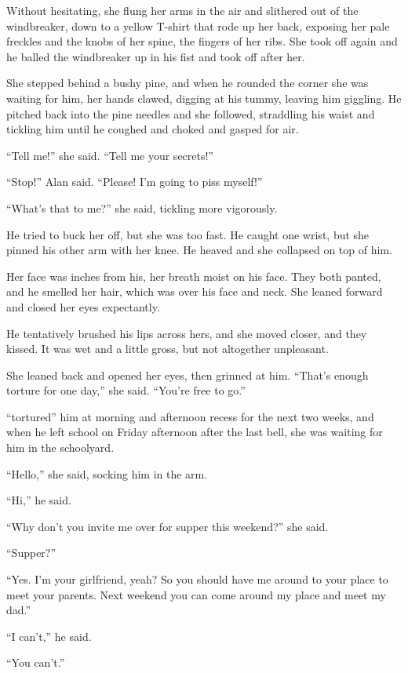 Without hesitating, she flung her arms in the air and slithered out of
the windbreaker, down to a yellow T-shirt that rode up her back,
exposing her pale freckles and the knobs of her spine, the fingers of
her ribs.  She took off again and he balled the windbreaker up in his
fist and took off after her.

She stepped behind a bushy pine, and when he rounded the corner she
was waiting for him, her hands clawed, digging at his tummy, leaving
him giggling.  He pitched back into the pine needles and she followed,
straddling his waist and tickling him until he coughed and choked and
gasped for air.

``Tell me!'' she said.  ``Tell me your secrets!''

``Stop!'' Alan said.  ``Please!  I'm going to piss myself!''

``What's that to me?'' she said, tickling more vigorously.

He tried to buck her off, but she was too fast.  He caught one wrist,
but she pinned his other arm with her knee.  He heaved and she
collapsed on top of him.

Her face was inches from his, her breath moist on his face.  They both
panted, and he smelled her hair, which was over his face and neck. 
She leaned forward and closed her eyes expectantly.

He tentatively brushed his lips across hers, and she moved closer, and
they kissed.  It was wet and a little gross, but not altogether
unpleasant.

She leaned back and opened her eyes, then grinned at him.  ``That's
enough torture for one day,'' she said.  ``You're free to go.''

 ``tortured'' him at morning and afternoon recess for the next two
weeks, and when he left school on Friday afternoon after the last
bell, she was waiting for him in the schoolyard.

``Hello,'' she said, socking him in the arm.

``Hi,'' he said.

``Why don't you invite me over for supper this weekend?'' she said.

``Supper?''

``Yes.  I'm your girlfriend, yeah?  So you should have me around to
your place to meet your parents.  Next weekend you can come around my
place and meet my dad.''

``I can't,'' he said.

``You can't.''

